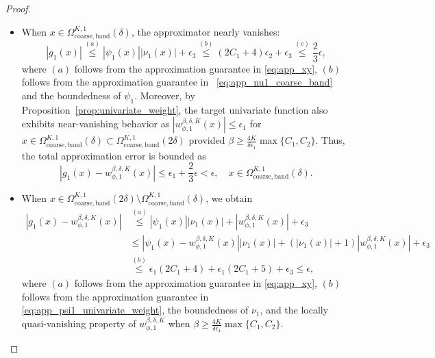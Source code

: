 \documentclass[11pt]{article}
\begin{document}
\begin{proof}
\begin{itemize}
        \item When $x \in \Omega_{\mathrm{coarse, band}}^{K, 1}(\delta)$, the approximator nearly vanishes:
        \begin{equation*}
            |g_1(x)| \overset{(a)}{\leq} |\psi_1(x)| |\nu_1(x) | + \epsilon_3  \overset{(b)}{\leq} (2C_1 + 4) \epsilon_2 + \epsilon_3 \overset{(c)}{\leq} \frac{2}{3} \epsilon,
        \end{equation*}
        where $(a)$ follows from the approximation guarantee in \eqref{eq:app_xy}, $(b)$ follows from the approximation guarantee in ~\eqref{eq:app_nu1_coarse_band} and the boundedness of $\psi_1$. Moreover, by Proposition~\ref{prop:univariate_weight}, the target univariate function also exhibits near-vanishing behavior as $|w_{\phi,1}^{\beta, \delta, K}(x)| \leq \epsilon_1$ for $x \in \Omega_{\mathrm{coarse,band}}^{K,1}(\delta) \subset \Omega_{\mathrm{coarse,band}}^{K,1}(2 \delta) $ provided $\beta \geq \frac{4K}{\delta \epsilon_1} \max \{C_1, C_2\}$. Thus, the total approximation error is bounded as
        \begin{equation*}
            |g_1(x) - w_{\phi,1}^{\beta, \delta,K}(x)| \leq \epsilon_1 + \frac{2}{3} \epsilon < \epsilon, \quad x \in \Omega_{\mathrm{coarse,band}}^{K,1}(\delta).
        \end{equation*}
        \item When $x \in \Omega_{\mathrm{coarse,band}}^{K,1}(2 \delta) \setminus \Omega_{\mathrm{coarse,band}}^{K,1}( \delta)$, we obtain 
        \begin{equation*}
            \begin{aligned}
               |g_1(x) - w_{\phi,1}^{\beta, \delta, K}(x)| & \overset{(a)}{\leq}|\psi_1(x)||\nu_1(x)| + |w_{\phi,1}^{\beta, \delta, K}(x)| + \epsilon_3 \\
                & \leq |\psi_1(x) - w_{{\phi},1}^{\beta, \delta, K}(x) | |\nu_1(x)| + ( |\nu_1(x)| + 1) |w_{\phi,1}^{\beta, \delta, K}(x)| + \epsilon_3 \\
                & \overset{(b)}{\leq} \epsilon_1 (2C_1 + 4) + \epsilon_1(2C_1 + 5) + \epsilon_3 \leq \epsilon,
            \end{aligned}
        \end{equation*}
        where $(a)$ follows from the approximation guarantee in \eqref{eq:app_xy}, $(b)$ follows from the approximation guarantee in \eqref{eq:app_psi1_univariate_weight}, the boundedness of $\nu_1$, and the locally quasi-vanishing property of $w_{\phi,1}^{\beta, \delta, K}$ when $\beta \geq \frac{4K}{\delta \epsilon_1} \max \{C_1, C_2\}$.
    \end{itemize}


\end{proof}
\end{document}
